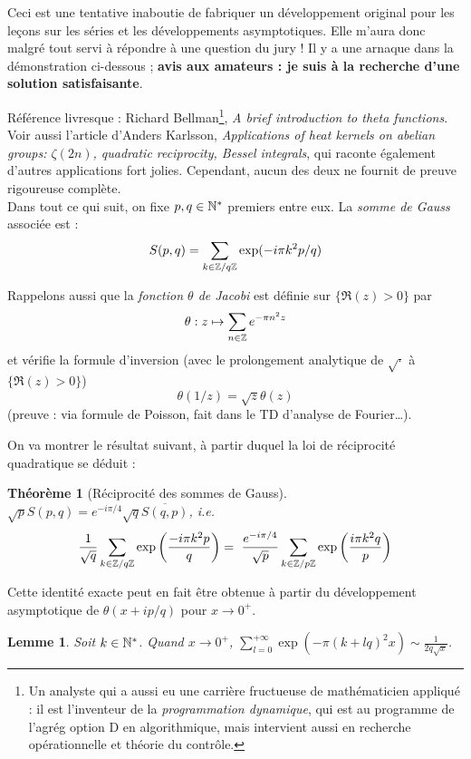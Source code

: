 \documentclass[a4paper, 11pt]{article}
\newtheorem*{theorem}{Théorème}
\newtheorem*{lemma}{Lemme}
\begin{document}
Ceci est une tentative inaboutie de fabriquer un développement original pour les
leçons sur les séries et les développements asymptotiques. Elle m'aura donc
malgré tout servi à répondre à une question du jury ! Il y a une arnaque dans la
démonstration ci-dessous ; \textbf{avis aux amateurs : je suis à la recherche
  d'une solution satisfaisante}.

Référence livresque : Richard Bellman\footnote{Un analyste qui a aussi eu une
  carrière fructueuse de mathématicien appliqué : il est l'inventeur de la
  \emph{programmation dynamique}, qui est au programme de l'agrég option D en
  algorithmique, mais intervient aussi en recherche opérationnelle et théorie du
  contrôle.}, \emph{A brief introduction to theta functions}. Voir aussi
l'article d'Anders Karlsson, \emph{Applications of heat kernels on abelian
  groups: $\zeta(2n)$, quadratic reciprocity, Bessel integrals}, qui raconte
également d'autres applications fort jolies. Cependant, aucun des deux ne
fournit de preuve rigoureuse complète.\\

Dans tout ce qui suit, on fixe $p, q \in \mathbb{N}^*$ premiers entre eux. La
\emph{somme de Gauss} associée est :
\[S(p,q) = \sum_{k \in \mathbb{Z}/q\mathbb{Z}} \exp(-i\pi k^2 p/q) \]

Rappelons aussi que la \emph{fonction $\theta$ de Jacobi} est définie sur
$\{\Re(z) > 0\}$ par
\[ \theta : z \mapsto \sum_{n \in \mathbb{Z}} e^{-\pi n^2 z} \]
et vérifie la formule d'inversion (avec le prolongement analytique de
$\sqrt{\cdot}$ à $\{\Re(z) > 0\}$)
\[ \theta(1/z) = \sqrt{z}\theta(z) \]
(preuve : via formule de Poisson, fait dans le TD d'analyse de Fourier…).

On va montrer le résultat suivant, à partir duquel la loi de réciprocité
quadratique se déduit :

\begin{theorem}[Réciprocité des sommes de Gauss]
  $\sqrt{p}S(p,q) = e^{-i\pi/4}\sqrt{q}\overline{S(q,p)}$, i.e.
  \[ \frac{1}{\sqrt{q}} \sum_{k \in \mathbb{Z}/q\mathbb{Z}}
    \exp\left(\frac{-i\pi k^2 p}{q}\right) =
    \ \frac{e^{-i\pi/4}}{\sqrt{p}} \sum_{k \in \mathbb{Z}/p\mathbb{Z}}
    \exp\left(\frac{i\pi k^2 q}{p}\right) \]
\end{theorem}

Cette identité exacte peut en fait être obtenue à partir du développement
asymptotique de $\theta(x + ip/q)$ pour $x \to 0^+$.

\begin{lemma} Soit $k \in \mathbb{N}^*$. Quand $x \to 0^+$,
  $\displaystyle \sum_{l = 0}^{+\infty} \exp(-\pi(k+lq)^2x)
  \sim \frac{1}{2q\sqrt{x}}$.
\end{lemma}
\end{document}
